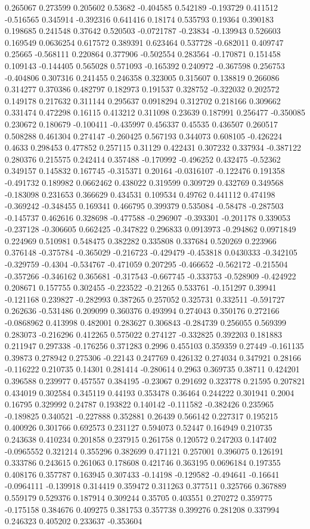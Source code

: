 0.265067 0.273599 0.205602 0.53682 -0.404585 0.542189 -0.193729 0.411512 -0.516565 0.345914 -0.392316 0.641416 0.18174 0.535793 0.19364 0.390183 0.198685 0.241548 0.37642 0.520503 -0.0721787 -0.23834 -0.139943 0.526603 0.169549 0.0636254 0.617572 0.389391 0.623464 0.537728 -0.682011 0.409747 0.25665 -0.568111 0.220864 0.377906 -0.502554 0.283564 -0.170871 0.151458 0.109143 -0.144405 0.565028 0.571093 -0.165392 0.240972 -0.367598 0.256753 -0.404806 0.307316 0.241455 0.246358 0.323005 0.315607 0.138819 0.266086 0.314277 0.370386 0.482797 0.182973 0.191537 0.328752 -0.322032 0.202572 0.149178 0.217632 0.311144 0.295637 0.0918294 0.312702 0.218166 0.309662 0.331474 0.472298 0.16115 0.413212 0.311098 0.23639 0.187991 0.256477 -0.350085 0.230672 0.180679 -0.100411 -0.435997 0.456337 0.45535 0.436507 0.260517 0.508288 0.461304 0.274147 -0.260425 0.567193 0.344073 0.608105 -0.426224 0.4633 0.298453 0.477852 0.257115 0.31129 0.422431 0.307232 0.337934 -0.387122 0.280376 0.215575 0.242414 0.357488 -0.170992 -0.496252 0.432475 -0.52362 0.349157 0.145832 0.167745 -0.315371 0.20164 -0.0316107 -0.122476 0.191358 -0.491732 0.189982 0.0662462 0.438022 0.319599 0.309729 0.432769 0.349568 -0.183098 0.231653 0.366629 0.434531 0.109534 0.49762 0.441112 0.474198 -0.369242 -0.348455 0.169341 0.466795 0.399379 0.535084 -0.58478 -0.287503 -0.145737 0.462616 0.328698 -0.477588 -0.296907 -0.393301 -0.201178 0.339053 -0.237128 -0.306605 0.662425 -0.347822 0.296833 0.0913973 -0.294862 0.0971849 0.224969 0.510981 0.548475 0.382282 0.335808 0.337684 0.520269 0.223966 0.376148 -0.375784 -0.365029 -0.216723 -0.429479 -0.453818 0.0430333 -0.342105 -0.329759 -0.4304 -0.534767 -0.471059 0.207295 -0.466652 -0.562172 -0.215504 -0.357266 -0.346162 0.365681 -0.317543 -0.667745 -0.333753 -0.528909 -0.424922 0.208671 0.157755 0.302455 -0.223522 -0.21265 0.533761 -0.151297 0.39941 -0.121168 0.239827 -0.282993 0.387265 0.257052 0.325731 0.332511 -0.591727 0.262636 -0.531486 0.209099 0.360376 0.493994 0.274043 0.350176 0.272166 -0.0868962 0.413998 0.482001 0.283627 0.306843 -0.284739 0.256055 0.569399 0.283073 -0.216296 0.412265 0.575022 0.274127 -0.332825 0.392203 0.181883 0.211947 0.297338 -0.176256 0.371283 0.2996 0.455103 0.359359 0.27449 -0.161135 0.39873 0.278942 0.275306 -0.22143 0.247769 0.426132 0.274034 0.347921 0.28166 -0.116222 0.210735 0.14301 0.281414 -0.280614 0.2963 0.369735 0.38711 0.424201 0.396588 0.239977 0.457557 0.384195 -0.23067 0.291692 0.323778 0.21595 0.207821 0.434019 0.302584 0.345119 0.44193 0.353478 0.36464 0.244222 0.301941 0.2004 0.16795 0.329992 0.24787 0.193822 0.140142 -0.111582 -0.382426 0.235965 -0.189825 0.340521 -0.227888 0.352881 0.26439 0.566142 0.227317 0.195215 0.400926 0.301766 0.692573 0.231127 0.594073 0.52447 0.164949 0.210735 0.243638 0.410234 0.201858 0.237915 0.261758 0.120572 0.247203 0.147402 -0.0965552 0.321214 0.355296 0.382699 0.471121 0.257001 0.396075 0.126191 0.333786 0.243615 0.261063 0.178608 0.421746 0.363195 0.0696184 0.197355 0.408176 0.357787 0.163945 0.307433 -0.14198 -0.129582 -0.494641 -0.16641 -0.0964111 -0.139918 0.314419 0.359472 0.311263 0.377511 0.325766 0.367889 0.559179 0.529376 0.187914 0.309244 0.35705 0.403551 0.270272 0.359775 -0.175158 0.384676 0.409275 0.381753 0.357738 0.399276 0.281208 0.337994 0.246323 0.405202 0.233637 -0.353604 